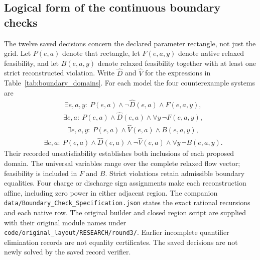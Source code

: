\subsection{Logical form of the continuous boundary checks}
The twelve saved decisions concern the declared parameter rectangle, not
just the grid. Let $P(e,a)$ denote that rectangle, let $F(e,a,y)$ denote
native relaxed feasibility, and let $B(e,a,y)$ denote relaxed feasibility
together with at least one strict reconstructed violation. Write
$\widehat D$ and $\widehat V$ for the expressions in
Table~\ref{tab:boundary_domains}. For each model the four counterexample
systems are
\begin{equation}\begin{aligned}
&\exists e,a,y:\ P(e,a)\land\neg\widehat D(e,a)\land F(e,a,y),
\label{eq:domain_check_one}\end{aligned}\end{equation}
\begin{equation}\begin{aligned}
&\exists e,a:\ P(e,a)\land\widehat D(e,a)\land
                 \forall y\,\neg F(e,a,y),\label{eq:domain_check_two}\end{aligned}\end{equation}
\begin{equation}\begin{aligned}
&\exists e,a,y:\ P(e,a)\land\widehat V(e,a)\land B(e,a,y),
\label{eq:domain_check_three}\end{aligned}\end{equation}
\begin{equation}\begin{aligned}
&\exists e,a:\ P(e,a)\land\widehat D(e,a)\land\neg\widehat V(e,a)
                 \land\forall y\,\neg B(e,a,y).\label{eq:domain_check_four}
\end{aligned}\end{equation}
Their recorded unsatisfiability establishes both inclusions of each proposed
domain. The universal variables range over the complete relaxed flow vector;
feasibility is included in $F$ and $B$. Strict violations retain admissible
boundary equalities. Four charge or discharge sign assignments make each
reconstruction affine, including zero power in either adjacent region.
The companion \texttt{data/Boundary\_Check\_Specification.json} states the exact
rational recursions and each native row. The original builder and closed
region script are supplied with their original module names under
\texttt{code/original\_layout/RESEARCH/round3/}. Earlier incomplete quantifier
elimination records are not equality certificates. The saved decisions are
not newly solved by the saved record verifier.


